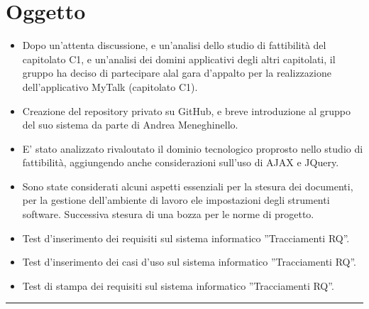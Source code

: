 \documentclass[a4paper,10pt,openright]{article}
\begin{document}
\section*{Oggetto}
\begin{itemize}
	\item Dopo un'attenta discussione, e un'analisi dello studio di fattibilità del capitolato C1, e un'analisi dei domini applicativi degli altri capitolati, il gruppo ha deciso di partecipare alal gara d'appalto per la realizzazione dell'applicativo MyTalk (capitolato C1).
	\item Creazione del repository privato su GitHub, e breve introduzione al gruppo del suo sistema da parte di Andrea Meneghinello.
	\item {E'} stato analizzato rivaloutato il dominio tecnologico proprosto nello studio di fattibilità, aggiungendo anche considerazioni sull'uso di AJAX e JQuery.
	\item Sono state considerati alcuni aspetti essenziali per la stesura dei documenti, per la gestione dell'ambiente di lavoro ele impostazioni degli strumenti software. Successiva stesura di una bozza per le norme di progetto.
	\item Test d'inserimento dei requisiti sul sistema informatico ''Tracciamenti RQ''.
	\item Test d'inserimento dei casi d'uso sul sistema informatico ''Tracciamenti RQ''.
	\item Test di stampa dei requisiti sul sistema informatico ''Tracciamenti RQ''.
\end{itemize}
\noindent\rule{\textwidth}{0.4pt}
\end{document}
